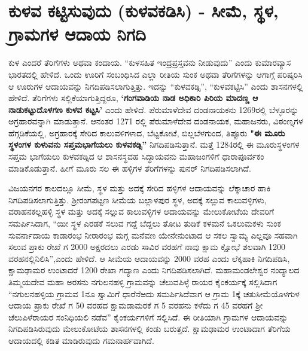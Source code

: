 \section{ಕುಳವ ಕಟ್ಟಿಸುವುದು (ಕುಳವಕಡಿಸಿ) - ಸೀಮೆ, ಸ್ಥಳ, ಗ್ರಾಮಗಳ ಆದಾಯ ನಿಗದಿ}

ಕುಳ ಎಂದರೆ ತೆರಿಗೆಗಳು ಅಥವಾ ಕಂದಾಯ. “ಕುಳಸಹಿತ ಇಂದ್ರಪ್ರಸ್ತವನು ನೀಡುವುದು” ಎಂದು ಕುಮಾರವ್ಯಾಸ ಭಾರತದಲ್ಲಿ ಹೇಳಿದೆ. ಒಂದು ಊರಿಗೆ ಸಂಬಂಧಿಸಿದ ಎಲ್ಲಾ ರೀತಿಯ ಸುಂಕ ಅಥವಾ ತೆರಿಗೆಗಳನ್ನು ಆಗಾಗ್ಗೆ ಪರಿಷ್ಕರಿಸಿ ಆ ಊರುಗಳ ಆದಾಯವನ್ನು ನಿಗದಿಪಡಿಸಲಾಗುತ್ತಿತ್ತು. ಇದನ್ನು “ಕುಳವಕಡ್ಸಿ”, “ಕುಳವಕಟ್ಟಿಸಿ” ಎಂದು ಶಾಸನಗಳಲ್ಲಿ ಹೇಳಿದೆ. ತೆರಿಗೆಗಳು ಸಲ್ಲಿಕೆಯಾಗುತ್ತಿದ್ದರೂ, \textbf{‘ಗಂಗವಾಡಿಯ ನಾಡ ಅಧಿಕಾರಿ ಪಿರಿಯ ಮಾದಣ್ಣ ಆ ನಾಡುಕಟ್ಟುದೊಳಗಣ ಕುಳವ ಕಟ್ಟಸಿ’} ಎಂದು ಹೇಳಿದೆ. ಪೆರುಮಾಳೆದೇವ ದಂಡನಾಯಕನು 1269ರಲ್ಲಿ ಬೆಳ್ಳೂರನ್ನು ಅಗ್ರಹಾರವನ್ನಾಗಿ ಮಾಡುತ್ತಾನೆ. ಆನಂತರ 1271 ರಲ್ಲಿ ಪೆರುಮಾಳೆದೇವ ದಂಡನಾಯಕ, ಮಹಾಜನರು, ವಿಠಂಣ್ನಗಳ ಹೆಗ್ಗಡಿಕೆಯಲ್ಲಿ, ಅಗ್ರಹಾರಕ್ಕೆ ಸೇರಿದ ಕಾಲುವಳಿಗಳಾದ, ಬೆಟ್ಟಕೋಟೆ, ಬಿಲ್ಲಬೆಳಗುಂದ, ತಿಪ್ಪೂರು \textbf{"ಈ ಮೂರು ಸ್ಥಳಂಗಳ ಕುಳುವನು ಸಪ್ತಮಭಾಗೆಯಲು ಕುಳವಕಡ್ಸಿ”} ನಿಗದಿಪಡಿಸುತ್ತಾನೆ. ಮತ್ತೆ 1284ರಲ್ಲಿ ಈ ಮೂರುಸ್ಥಳಂಗಳ ಸಪ್ತಮ ಭಾಗೆಯಲು ಕುಳವಕಡ್ಸಿದ ಆ ಶಾಸನಸ್ಥವಹ ಸಿದ್ಧಾಯವನು ಮಹಾಜಂಗಳಿಗೆ ಧಾರಾಪೂರ್ವಕಂ ಮಾಡಿಕೊಡುತ್ತಾನೆ. ಹೀಗೆ ಮೂರು ಸಲ ಈ ಹಳ್ಳಿಗಳ ತೆರಿಗೆಗಳನ್ನು ಪುನರ್​ ನಿಗದಿಪಡಿಸಲಾಗಿದೆ.

ವಿಜಯನಗರ ಕಾಲದಲ್ಲೂ ಸೀಮೆ, ಸ್ಥಳ ಮತ್ತು ಅದಕ್ಕೆ ಸೇರಿದ ಹಳ್ಳಿಗಳ ಆದಾಯವನ್ನು ಲೆಕ್ಕಾಚಾರ ಹಾಕಿ ನಿಗದಿಪಡಿಸಲಾಗುತ್ತಿತ್ತು. ಶ‍್ರೀರಂಗಪಟ್ಟಣ ಸೀಮೆಯ ಬಲ್ಲಾಳಪುರ ಸ್ಥಳ, ಅದಕ್ಕೆ ಸಲ್ಲುವ ಕಾಲುವಳ್ಳಿಗಳು, ವರಾಹನಕಲ್ಲಹಳ್ಳಿ ಸ್ಥಳ ಮತ್ತು ಅದಕ್ಕೆ ಸಲ್ಲುವ ಕಾಲುವಳ್ಳಿಗಳ ಆದಾಯವನ್ನು ಮೇಲುಕೋಟೆಯ ದೇವರಿಗೆ ಸಮರ್ಪಿಸಿದಾಗ, “ಯೀ ಸ್ಥಳ ಎರಡಕೆ ಸಲುವ ಗದ್ದೆ ಬೆದ್ದಲು ತೋಟ ತುಡಿಕೆ ಕಳಮನೆ ಒಕಲುಮಕಳು ಸುಂಕ ಸುವರ್ನಾದಾಯ ಕಾಡಾರಂಭ ನೀರಾರಂಭ ಮಗ್ಗ ಮನೆವಣ ಯೇನೇನುಂಟಾದ ಆ ಸಕಲ ಸ್ವಾಮ್ಯ ಎಲ್ಲವೂ ಸಹವಾಗಿ ಸಲುವ ಪ್ರಾಕು ರೇಖೆ ಗ 2000 ಅಕ್ಷರದಲು ಎರಡು ಸಾವಿರ ವರಹಗೆ ನಾವು ಕ್ಷಾಮ ಕ್ಷೋಭೆ ಶಲವಾಗಿ 1200 ವರಹನಲ್ಲಿನಿಲಿಸಿ”,ಎಂದು ಹೇಳಿದೆ. ಆ ಸೀಮೆಯ ಆದಾಯವನ್ನು 2000 ವರಹ ಎಂದು ಲೆಕ್ಕಹಾಕಿ ನಿಗದಿಪಡಿಸಿ, ಕ್ಷಾಮಢಾಮರ ಉಂಟಾದರೆ 1200 ರೇಖಾ ಗದ್ಯಾಣ ಎಂದು ನಿಗದಿಪಡಿಸಲಾಗಿದೆ. ಮಹಾಮಂಡಲೇಶ್ವರ ನಂದ್ಯಾಲದ ತಿಮ್ಮಯದೇವ ಮಹಾ ಅರಸನು ನಗುಲನಹಳ್ಳಿ ಗ್ರಾಮವನ್ನು ಚೆಲುವಪಿಳ್ಳೆ ರಾಯರ ಕೈಂಕರ್ಯಕ್ಕೆ ಸಲ್ಲಿಸಿದಾಗ “ನಗುಲನಹಳ್ಳಿಯ ಗ್ರಾಮವ 1ನೂ ಸ್ವಾಮಿಗೆ ಧಾರೆನೆಱದು ಸಮರ್ಪಿಸಿದೆವಾಗ ಆ ಗ್ರಾಮ 1ಕ್ಕೆ ಚತುಸೀಮೆಯೊಳಗುಳ ಆದಾಯ ಪ್ರಾಕು ರೇಖೆ ಗ 50 ವರಹದ ಕ್ಷಾಮಡಾಮರಕೆ ಗ 5 ವರಹನು ಕಳೆದು ಗ 45 ವರಹಗೆ ಶ‍್ರೀ ಚೆಲುಪಿಳೆರಾಯರ ಸಂನಿಧಿಯಲಿ ನಡೆವ” ಕೈಂಕರ್ಯಗಳಿಗೆ ಸಲ್ಲಿಸಿದೆ. ಈ ರೀತಿಯಾಗಿ ಗ್ರಾಮಗಳ ಆದಾಯವನ್ನು ನಿಗದಿಪಡಿಸಿರುವುದು ಮೇಲುಕೋಟೆಯ ಶಾಸನಗಳಲ್ಲಿ ಕಂಡು ಬರುತ್ತದೆ. ಕ್ಷಾಮಢಾಮರ ಉಂಟಾದಾಗ ತೆರಿಗೆಯ ಆದಾಯದಲ್ಲಿ ಕಡಿತ ಮಾಡಿರುವುದು ಗಮನಾರ್ಹವಾಗಿದೆ.

